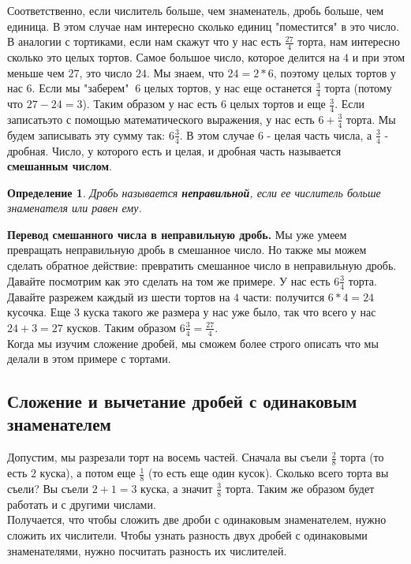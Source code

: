 \documentclass{article}
\begin{document}
Соответственно, если числитель больше, чем знаменатель, дробь больше, чем единица. В этом случае нам интересно сколько единиц "поместится" в это число. В аналогии с тортиками, если нам скажут что у нас есть $\frac{27}{4}$ торта, нам интересно сколько это целых тортов. Самое большое число, которое делится на $4$ и при этом меньше чем $27$, это число $24$. Мы знаем, что $24 = 2*6$, поэтому целых тортов у нас $6$. Если мы "заберем" $~6$ целых тортов, у нас еще останется $\frac34$ торта (потому что $27-24 = 3$). Таким образом у нас есть $6$ целых тортов и еще $\frac34$. Если записатьэто с помощью математического выражения, у нас есть $6 + \frac34$ торта. Мы будем записывать эту сумму так: $6\frac34$. В этом случае $6$ - целая часть числа, а $\frac34$ - дробная. Число, у которого есть и целая, и дробная часть называется \textbf{смешанным числом}.
\newtheorem{Def}{Определение}
\begin{Def}
Дробь называется \textbf{неправильной}, если ее числитель больше знаменателя или равен ему.
\end{Def}

\textbf{Перевод смешанного числа в неправильную дробь.} Мы уже умеем превращать неправильную дробь в смешанное число. Но также мы можем сделать обратное действие: превратить смешанное число в неправильную дробь. Давайте посмотрим как это сделать на том же примере. У нас есть $6\frac34$ торта. Давайте разрежем каждый из шести тортов на $4$ части: получится $6*4 = 24$ кусочка. Еще $3$ куска такого же размера у нас уже было, так что всего у нас $24+3 = 27$ кусков. Таким образом $6\frac34 = \frac{27}4$.\\

Когда мы изучим сложение дробей, мы сможем более строго описать что мы делали в этом примере с тортами. 

\subsection{Сложение и вычетание дробей с одинаковым знаменателем}
Допустим, мы разрезали торт на восемь частей. Сначала вы съели $\frac28$ торта (то есть $2$ куска), а потом еще $\frac18$ (то есть еще один кусок). Сколько всего торта вы съели? Вы съели $2+1=3$ куска, а значит $\frac38$ торта. Таким же образом будет работать и с другими числами.\\
Получается, что чтобы сложить две дроби с одинаковым знаменателем, нужно сложить их числители. Чтобы узнать разность двух дробей с одинаковыми знаменателями, нужно посчитать разность их числителей.\\
\end{document}
